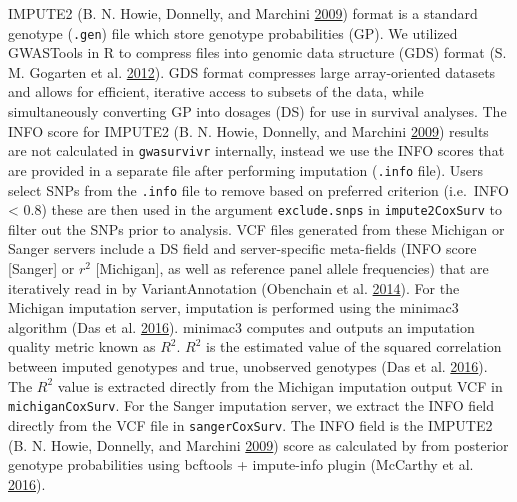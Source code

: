 \documentclass[]{DissertateOSU}
\begin{document}
IMPUTE2 (B. N. Howie, Donnelly, and Marchini
\protect\hyperlink{ref-Howie_2009}{2009}) format is a standard genotype
(\texttt{.gen}) file which store genotype probabilities (GP). We
utilized GWASTools in R to compress files into genomic data structure
(GDS) format (S. M. Gogarten et al.
\protect\hyperlink{ref-gwastools}{2012}). GDS format compresses large
array-oriented datasets and allows for efficient, iterative access to
subsets of the data, while simultaneously converting GP into dosages
(DS) for use in survival analyses. The INFO score for IMPUTE2 (B. N.
Howie, Donnelly, and Marchini \protect\hyperlink{ref-Howie_2009}{2009})
results are not calculated in \texttt{gwasurvivr} internally, instead we
use the INFO scores that are provided in a separate file after
performing imputation (\texttt{.info} file). Users select SNPs from the
\texttt{.info} file to remove based on preferred criterion (i.e.~INFO
\textless{} 0.8) these are then used in the argument
\texttt{exclude.snps} in \texttt{impute2CoxSurv} to filter out the SNPs
prior to analysis. VCF files generated from these Michigan or Sanger
servers include a DS field and server-specific meta-fields (INFO score
{[}Sanger{]} or \(r^2\) {[}Michigan{]}, as well as reference panel
allele frequencies) that are iteratively read in by VariantAnnotation
(Obenchain et al. \protect\hyperlink{ref-variantannotation}{2014}). For
the Michigan imputation server, imputation is performed using the
minimac3 algorithm (Das et al.
\protect\hyperlink{ref-michigan_imputation}{2016}). minimac3 computes
and outputs an imputation quality metric known as \(R^2\). \(R^2\) is
the estimated value of the squared correlation between imputed genotypes
and true, unobserved genotypes (Das et al.
\protect\hyperlink{ref-michigan_imputation}{2016}). The \(R^2\) value is
extracted directly from the Michigan imputation output VCF in
\texttt{michiganCoxSurv}. For the Sanger imputation server, we extract
the INFO field directly from the VCF file in \texttt{sangerCoxSurv}. The
INFO field is the IMPUTE2 (B. N. Howie, Donnelly, and Marchini
\protect\hyperlink{ref-Howie_2009}{2009}) score as calculated by from
posterior genotype probabilities using bcftools + impute-info plugin
(McCarthy et al. \protect\hyperlink{ref-hrc}{2016}).
\end{document}
